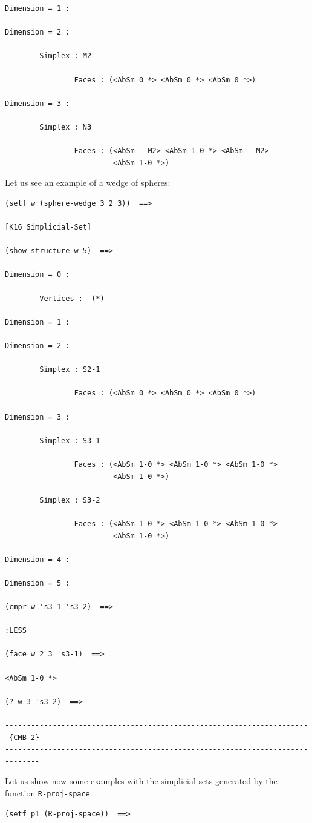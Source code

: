 {{\begin{verbatim}
Dimension = 1 :

Dimension = 2 :

        Simplex : M2

                Faces : (<AbSm 0 *> <AbSm 0 *> <AbSm 0 *>)

Dimension = 3 :

        Simplex : N3

                Faces : (<AbSm - M2> <AbSm 1-0 *> <AbSm - M2>
                         <AbSm 1-0 *>)

\end{verbatim}}
Let us see an example of a wedge of spheres:
{\footnotesize\begin{verbatim}
(setf w (sphere-wedge 3 2 3))  ==>

[K16 Simplicial-Set]

(show-structure w 5)  ==>

Dimension = 0 :

        Vertices :  (*)

Dimension = 1 :

Dimension = 2 :

        Simplex : S2-1

                Faces : (<AbSm 0 *> <AbSm 0 *> <AbSm 0 *>)

Dimension = 3 :

        Simplex : S3-1

                Faces : (<AbSm 1-0 *> <AbSm 1-0 *> <AbSm 1-0 *>
                         <AbSm 1-0 *>)

        Simplex : S3-2

                Faces : (<AbSm 1-0 *> <AbSm 1-0 *> <AbSm 1-0 *>
                         <AbSm 1-0 *>)

Dimension = 4 :

Dimension = 5 :

(cmpr w 's3-1 's3-2)  ==>

:LESS

(face w 2 3 's3-1)  ==>

<AbSm 1-0 *>

(? w 3 's3-2)  ==>

-----------------------------------------------------------------------{CMB 2}
------------------------------------------------------------------------------
\end{verbatim}}
\newpage
Let us show now some examples with the simplicial sets generated by the
function {\tt R-proj-space}.
{\footnotesize\begin{verbatim}
(setf p1 (R-proj-space))  ==>


\end{verbatim}}}
